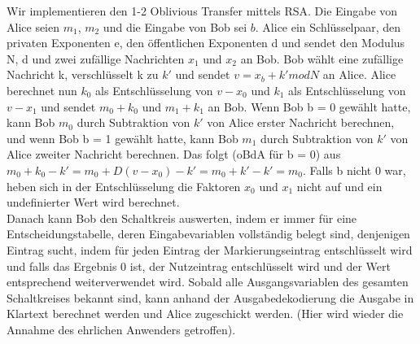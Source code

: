 \documentclass{article}
\begin{document}
Wir implementieren den 1-2 Oblivious Transfer mittels RSA. Die Eingabe
von Alice seien \(m_1\), \(m_2\) und die Eingabe von Bob sei \(b\).
Alice ein Schl\"usselpaar, den privaten Exponenten e, den
\"offentlichen Exponenten d und sendet den Modulus N, d und zwei zuf\"allige
Nachrichten \(x_1\) und \(x_2\) an Bob. Bob w\"ahlt eine zuf\"allige Nachricht
k, verschl\"usselt k zu \(k'\) und sendet \(v = x_b + k' mod N\) an Alice. 
Alice berechnet nun \(k_0\) als Entschl\"usselung von \(v - x_0\) und 
\(k_1\) als Entschl\"usselung von \(v - x_1\) und sendet \(m_0 + k_0\) und
\(m_1 + k_1\) an Bob. Wenn Bob b = 0 gew\"ahlt hatte, kann Bob \(m_0\)
durch Subtraktion von \(k'\) von Alice erster Nachricht berechnen, und wenn
Bob b = 1 gew\"ahlt hatte, kann Bob \(m_1\) durch Subtraktion von \(k'\) von
Alice zweiter Nachricht berechnen. Das folgt (oBdA f\"ur b = 0) aus
\(m_0 + k_0 - k' = m_0 + D(v - x_0) - k' = m_0 + k' - k' = m_0\). Falls b 
nicht 0 war, heben sich in der Entschl\"usselung die Faktoren \(x_0\) und
\(x_1\) nicht auf und ein undefinierter Wert wird berechnet. \\
Danach kann Bob den Schaltkreis auswerten, indem er immer f\"ur eine 
Entscheidungstabelle, deren Eingabevariablen vollst\"andig belegt sind,
denjenigen Eintrag sucht, indem f\"ur jeden Eintrag der Markierungseintrag
entschl\"usselt wird und falls das Ergebnis 0 ist, der Nutzeintrag
entschl\"usselt wird und der Wert entsprechend weiterverwendet wird. Sobald
alle Ausgangsvariablen des gesamten Schaltkreises bekannt sind, kann anhand
der Ausgabedekodierung die Ausgabe in Klartext berechnet werden und Alice 
zugeschickt werden. (Hier wird wieder die Annahme des ehrlichen Anwenders
getroffen).
\end{document}
